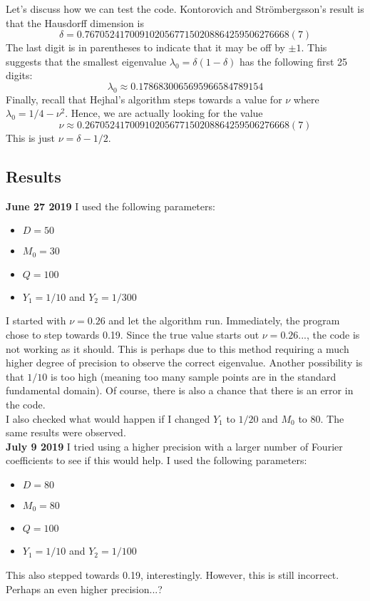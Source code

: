 \documentclass[]{article}
\begin{document}
Let's discuss how we can test the code.
Kontorovich and Str\"ombergsson's result is that the Hausdorff dimension is
$$
\delta = 0.76705241700910205677150208864259506276668(7)
$$
The last digit is in parentheses to indicate that it may be off by $\pm1$.
This suggests that the smallest eigenvalue $\lambda_0 = \delta(1-\delta)$ has the following first 25 digits:
$$
\lambda_0 \approx 0.1786830065695966584789154
$$
Finally, recall that Hejhal's algorithm steps towards a value for $\nu$ where $\lambda_0 = 1/4 - \nu^2$.
Hence, we are actually looking for the value
$$
\nu \approx 0.26705241700910205677150208864259506276668(7)
$$
This is just $\nu = \delta - 1/2$.

\subsection{Results}

\textbf{June 27 2019}
I used the following parameters:
\begin{itemize}
	\item $D = 50$
	\item $M_0 = 30$
	\item $Q = 100$
	\item $Y_1 = 1/10$ and $Y_2 = 1/300$
\end{itemize}
I started with $\nu = 0.26$ and let the algorithm run.
Immediately, the program chose to step towards 0.19.
Since the true value starts out $\nu = 0.26...$, the code is not working as it should.
This is perhaps due to this method requiring a much higher degree of precision to observe the correct eigenvalue.
Another possibility is that $1/10$ is too high (meaning too many sample points are in the standard fundamental domain).
Of course, there is also a chance that there is an error in the code.
\\

I also checked what would happen if I changed $Y_1$ to $1/20$ and $M_0$ to $80$.
The same results were observed.
\\

\noindent \textbf{July 9 2019}
I tried using a higher precision with a larger number of Fourier coefficients to see if this would help.
I used the following parameters:
\begin{itemize}
	\item $D = 80$
	\item $M_0 = 80$
	\item $Q = 100$
	\item $Y_1 = 1/10$ and $Y_2 = 1/100$
\end{itemize}
This also stepped towards 0.19, interestingly.
However, this is still incorrect.
Perhaps an even higher precision...?
\end{document}
